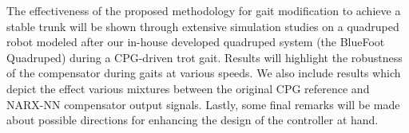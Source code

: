 The effectiveness of the proposed methodology for gait modification to achieve a stable trunk will be shown through extensive 
simulation studies on a quadruped robot modeled after our in-house developed quadruped system (the BlueFoot Quadruped) during a 
CPG-driven trot gait. Results will highlight the robustness of the compensator during gaits at various speeds. We also include results which depict the effect various mixtures between the original CPG reference and NARX-NN compensator output signals.
Lastly, some final remarks will be made about %
possible directions for enhancing the design of the controller at hand.